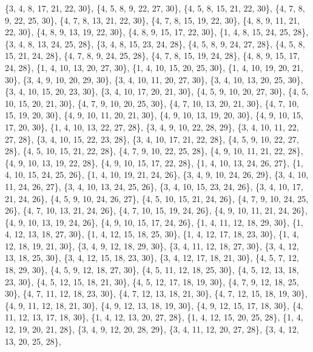 \documentclass[11pt,a4paper]{article}
\begin{document}
{\{3, 4, 8, 17, 21, 22, 30\}, \{4, 5, 8, 9, 22, 27, 30\}, \{4, 5, 8, 15, 21, 22, 30\}, \{4, 7, 8, 9, 22, 25, 30\}, \{4, 7, 8, 13, 21, 22, 30\},
\{4, 7, 8, 15, 19, 22, 30\}, \{4, 8, 9, 11, 21, 22, 30\}, \{4, 8, 9, 13, 19, 22, 30\}, \{4, 8, 9, 15, 17, 22, 30\}, \{1, 4, 8, 15, 24, 25, 28\},
\{3, 4, 8, 13, 24, 25, 28\}, \{3, 4, 8, 15, 23, 24, 28\}, \{4, 5, 8, 9, 24, 27, 28\}, \{4, 5, 8, 15, 21, 24, 28\}, \{4, 7, 8, 9, 24, 25, 28\},
\{4, 7, 8, 15, 19, 24, 28\}, \{4, 8, 9, 15, 17, 24, 28\}, \{1, 4, 10, 13, 20, 27, 30\}, \{1, 4, 10, 15, 20, 25, 30\}, \{1, 4, 10, 19, 20, 21, 30\},
\{3, 4, 9, 10, 20, 29, 30\}, \{3, 4, 10, 11, 20, 27, 30\}, \{3, 4, 10, 13, 20, 25, 30\}, \{3, 4, 10, 15, 20, 23, 30\}, \{3, 4, 10, 17, 20, 21, 30\},
\{4, 5, 9, 10, 20, 27, 30\}, \{4, 5, 10, 15, 20, 21, 30\}, \{4, 7, 9, 10, 20, 25, 30\}, \{4, 7, 10, 13, 20, 21, 30\}, \{4, 7, 10, 15, 19, 20, 30\},
\{4, 9, 10, 11, 20, 21, 30\}, \{4, 9, 10, 13, 19, 20, 30\}, \{4, 9, 10, 15, 17, 20, 30\}, \{1, 4, 10, 13, 22, 27, 28\}, \{3, 4, 9, 10, 22, 28, 29\},
\{3, 4, 10, 11, 22, 27, 28\}, \{3, 4, 10, 15, 22, 23, 28\}, \{3, 4, 10, 17, 21, 22, 28\}, \{4, 5, 9, 10, 22, 27, 28\}, \{4, 5, 10, 15, 21, 22, 28\},
\{4, 7, 9, 10, 22, 25, 28\}, \{4, 9, 10, 11, 21, 22, 28\}, \{4, 9, 10, 13, 19, 22, 28\}, \{4, 9, 10, 15, 17, 22, 28\}, \{1, 4, 10, 13, 24, 26, 27\},
\{1, 4, 10, 15, 24, 25, 26\}, \{1, 4, 10, 19, 21, 24, 26\}, \{3, 4, 9, 10, 24, 26, 29\}, \{3, 4, 10, 11, 24, 26, 27\}, \{3, 4, 10, 13, 24, 25, 26\},
\{3, 4, 10, 15, 23, 24, 26\}, \{3, 4, 10, 17, 21, 24, 26\}, \{4, 5, 9, 10, 24, 26, 27\}, \{4, 5, 10, 15, 21, 24, 26\}, \{4, 7, 9, 10, 24, 25, 26\},
\{4, 7, 10, 13, 21, 24, 26\}, \{4, 7, 10, 15, 19, 24, 26\}, \{4, 9, 10, 11, 21, 24, 26\}, \{4, 9, 10, 13, 19, 24, 26\}, \{4, 9, 10, 15, 17, 24, 26\},
\{1, 4, 11, 12, 18, 29, 30\}, \{1, 4, 12, 13, 18, 27, 30\}, \{1, 4, 12, 15, 18, 25, 30\}, \{1, 4, 12, 17, 18, 23, 30\}, \{1, 4, 12, 18, 19, 21, 30\},
\{3, 4, 9, 12, 18, 29, 30\}, \{3, 4, 11, 12, 18, 27, 30\}, \{3, 4, 12, 13, 18, 25, 30\}, \{3, 4, 12, 15, 18, 23, 30\}, \{3, 4, 12, 17, 18, 21, 30\},
\{4, 5, 7, 12, 18, 29, 30\}, \{4, 5, 9, 12, 18, 27, 30\}, \{4, 5, 11, 12, 18, 25, 30\}, \{4, 5, 12, 13, 18, 23, 30\}, \{4, 5, 12, 15, 18, 21, 30\},
\{4, 5, 12, 17, 18, 19, 30\}, \{4, 7, 9, 12, 18, 25, 30\}, \{4, 7, 11, 12, 18, 23, 30\}, \{4, 7, 12, 13, 18, 21, 30\}, \{4, 7, 12, 15, 18, 19, 30\},
\{4, 9, 11, 12, 18, 21, 30\}, \{4, 9, 12, 13, 18, 19, 30\}, \{4, 9, 12, 15, 17, 18, 30\}, \{4, 11, 12, 13, 17, 18, 30\}, \{1, 4, 12, 13, 20, 27, 28\},
\{1, 4, 12, 15, 20, 25, 28\}, \{1, 4, 12, 19, 20, 21, 28\}, \{3, 4, 9, 12, 20, 28, 29\}, \{3, 4, 11, 12, 20, 27, 28\}, \{3, 4, 12, 13, 20, 25, 28\},
}
\end{document}
